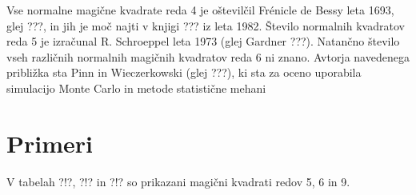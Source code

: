\documentclass[a4paper,12pt]{article}
\begin{document}
Vse normalne magične kvadrate reda 4 je oštevilčil Frénicle de Bessy
leta 1693, glej ???, in jih je moč najti v knjigi ???
iz leta 1982. Število normalnih kvadratov reda 5 je izračunal
R. Schroeppel leta 1973 (glej Gardner ???).
Natančno število vseh različnih normalnih magičnih kvadratov reda 6 ni znano.
Avtorja navedenega približka sta Pinn in Wieczerkowski (glej ???), ki
sta za oceno uporabila simulacijo Monte Carlo in metode statistične mehani\cite{bessy, berlekamp, gardner, pinn}


\section{Primeri}

V tabelah ?!?, ?!? in ?!? so prikazani
magični kvadrati redov 5, 6 in 9.





\newpage





\printindex
\end{document}

